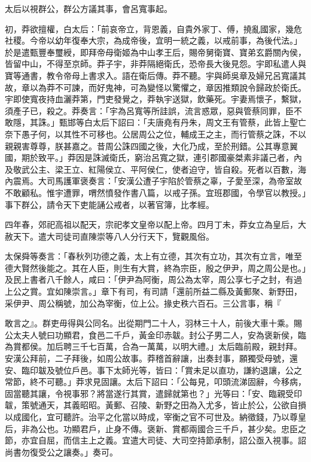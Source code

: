 \begin{pinyinscope}
太后以視群公，群公方議其事，會呂寬事起。

初，莽欲擅權，白太后：「前哀帝立，背恩義，自貴外家丁、傅，撓亂國家，幾危社稷。今帝以幼年復奉大宗，為成帝後，宜明一統之義，以戒前事，為後代法。」於是遣甄豐奉璽綬，即拜帝母衛姬為中山孝王后，賜帝舅衛寶、寶弟玄爵關內侯，皆留中山，不得至京師。莽子宇，非莽隔絕衛氏，恐帝長大後見怨。宇即私遣人與寶等通書，教令帝母上書求入。語在衛后傳。莽不聽。宇與師吳章及婦兄呂寬議其故，章以為莽不可諫，而好鬼神，可為變怪以驚懼之，章因推類說令歸政於衛氏。宇即使寬夜持血灑莽第，門吏發覺之，莽執宇送獄，飲藥死。宇妻焉懷子，繫獄，須產子已，殺之。莽奏言：「宇為呂寬等所詿誤，流言惑眾，惡與管蔡同罪，臣不敢隱，其誅。」甄邯等白太后下詔曰：「夫唐堯有丹朱，周文王有管蔡，此皆上聖亡奈下愚子何，以其性不可移也。公居周公之位，輔成王之主，而行管蔡之誅，不以親親害尊尊，朕甚嘉之。昔周公誅四國之後，大化乃成，至於刑錯。公其專意翼國，期於致平。」莽因是誅滅衛氏，窮治呂寬之獄，連引郡國豪桀素非議己者，內及敬武公主、梁王立、紅陽侯立、平阿侯仁，使者迫守，皆自殺。死者以百數，海內震焉。大司馬護軍褒奏言：「安漢公遭子宇陷於管蔡之辜，子愛至深，為帝室故不敢顧私。惟宇遭罪，喟然憤發作書八篇，以戒子孫。宜班郡國，令學官以教授。」事下群公，請令天下吏能誦公戒者，以著官簿，比孝經。

四年春，郊祀高祖以配天，宗祀孝文皇帝以配上帝。四月丁未，莽女立為皇后，大赦天下。遣大司徒司直陳崇等八人分行天下，覽觀風俗。

太保舜等奏言：「春秋列功德之義，太上有立德，其次有立功，其次有立言，唯至德大賢然後能之。其在人臣，則生有大賞，終為宗臣，殷之伊尹，周之周公是也。」及民上書者八千餘人，咸曰：「伊尹為阿衡，周公為太宰，周公享七子之封，有過上公之賞。宜如陳崇言。」章下有司，有司請「還前所益二縣及黃郵聚、新野田，采伊尹、周公稱號，加公為宰衡，位上公。掾史秩六百石。三公言事，稱『

敢言之』。群吏毋得與公同名。出從期門二十人，羽林三十人，前後大車十乘。賜公太夫人號曰功顯君，食邑二千戶，黃金印赤韍。封公子男二人，安為褒新侯，臨為賞都侯。加后聘三千七百萬，合為一萬萬，以明大禮。」太后臨前殿，親封拜。安漢公拜前，二子拜後，如周公故事。莽稽首辭讓，出奏封事，願獨受母號，還安、臨印韍及號位戶邑。事下太師光等，皆曰：「賞未足以直功，謙約退讓，公之常節，終不可聽。」莽求見固讓。太后下詔曰：「公每見，叩頭流涕固辭，今移病，固當聽其讓，令視事邪？將當遂行其賞，遣歸就第也？」光等曰：「安、臨親受印韍，策號通天，其義昭昭。黃郵、召陵、新野之田為入尤多，皆止於公，公欲自損以成國化，宜可聽許。治平之化當以時成，宰衡之官不可世及。納徵錢，乃以尊皇后，非為公也。功顯君戶，止身不傳。褒新、賞都兩國合三千戶，甚少矣。忠臣之節，亦宜自屈，而信主上之義。宜遣大司徒、大司空持節承制，詔公亟入視事。詔尚書勿復受公之讓奏。」奏可。


\end{pinyinscope}
